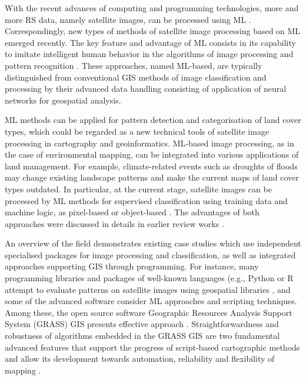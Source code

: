 \documentclass[12pt,a4paper,oneside]{article}
\def \newpar{\vspace{6pt}}
\begin{document}
\newpar With the recent advances of computing and programming technologies, more and more RS data, namely satellite images, can be processed using ML \citep{BELMAHDI2023100906,Lemenkova202021,GOMEZ201929}. Correspondingly, new types of methods of satellite image processing based on ML emerged recently. The key feature and advantage of ML consists in its capability to imitate intelligent human behavior in the algorithms of image processing and pattern recognition \citep{EBRAHIMY2023103390,PANDE2024141035,Lemenkova202217}. These approaches, named ML-based, are typically distinguished from conventional GIS methods of image classification and processing by their advanced data handling consisting of application of neural networks for geospatial analysis. 

\newpar ML methods can be applied for pattern detection and categorisation of land cover types, which could be regarded as a new technical tools of satellite image processing in cartography and geoinformatics. ML-based image processing, as in the case of environmental mapping, can be integrated into various applications of land management. For example, climate-related events such as droughts of floods may change existing landscape patterns and make the current maps of land cover types outdated. In particular, at the current stage, satellite images can be processed by ML methods for supervised classification using training data and machine logic, as pixel-based \citep{RAHMAN2020100410,AYOADE2023337} or object-based \citep{KARILA2023100046,Lemenkova202024,Lemenkova201528}. The advantages of both approaches were discussed in details in earlier review works \citep{NASIRI2023103555,ABUJAYYAB2023101802}. 

\newpar An overview of the field demonstrates existing case studies which use independent specialised packages for image processing and classification, as well as integrated approaches supporting GIS through programming. For instance, many programming libraries and packages of well-known languages (e.g., Python or R \citep{Lemenkova202324} attempt to evaluate patterns on satellite images using geospatial libraries \citep{Lemenkova202229,Lemenkova202227}, and some of the advanced software consider ML approaches and scripting techniques. Among these, the open source software Geographic Resources Analysis Support System (GRASS) GIS presents effective approach \citep{NETELER2012124,MitasovaNeteler}. Straightforwardness and robustness of algorithms embedded in the GRASS GIS are two fundamental advanced features that support the progress of script-based cartographic methods and allow its development towards automation, reliability and flexibility of mapping \citep{ROCCHINI201382,Lemenkova202307,ROCCHINI2017166}. 
\end{document}
